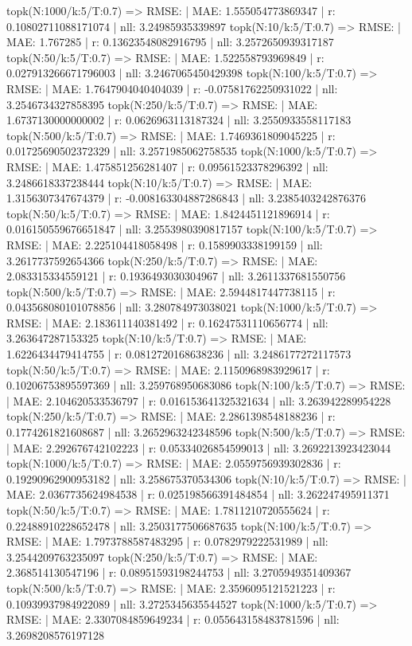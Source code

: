 topk(N:1000/k:5/T:0.7) => RMSE: | MAE: 1.555054773869347 | r: 0.10802711088171074 | nll: 3.24985935339897
topk(N:10/k:5/T:0.7) => RMSE: | MAE: 1.767285 | r: 0.13623548082916795 | nll: 3.2572650939317187
topk(N:50/k:5/T:0.7) => RMSE: | MAE: 1.522558793969849 | r: 0.027913266671796003 | nll: 3.2467065450429398
topk(N:100/k:5/T:0.7) => RMSE: | MAE: 1.7647904040404039 | r: -0.07581762250931022 | nll: 3.2546734327858395
topk(N:250/k:5/T:0.7) => RMSE: | MAE: 1.6737130000000002 | r: 0.0626963113187324 | nll: 3.2550933558117183
topk(N:500/k:5/T:0.7) => RMSE: | MAE: 1.7469361809045225 | r: 0.01725690502372329 | nll: 3.2571985062758535
topk(N:1000/k:5/T:0.7) => RMSE: | MAE: 1.475851256281407 | r: 0.09561523378296392 | nll: 3.2486618337238444
topk(N:10/k:5/T:0.7) => RMSE: | MAE: 1.3156307347674379 | r: -0.008163304887286843 | nll: 3.2385403242876376
topk(N:50/k:5/T:0.7) => RMSE: | MAE: 1.8424451121896914 | r: 0.016150559676651847 | nll: 3.2553980390817157
topk(N:100/k:5/T:0.7) => RMSE: | MAE: 2.225104418058498 | r: 0.1589903338199159 | nll: 3.2617737592654366
topk(N:250/k:5/T:0.7) => RMSE: | MAE: 2.083315334559121 | r: 0.1936493030304967 | nll: 3.2611337681550756
topk(N:500/k:5/T:0.7) => RMSE: | MAE: 2.5944817447738115 | r: 0.043568080101078856 | nll: 3.280784973038021
topk(N:1000/k:5/T:0.7) => RMSE: | MAE: 2.183611140381492 | r: 0.16247531110656774 | nll: 3.263647287153325
topk(N:10/k:5/T:0.7) => RMSE: | MAE: 1.6226434479414755 | r: 0.0812720168638236 | nll: 3.2486177272117573
topk(N:50/k:5/T:0.7) => RMSE: | MAE: 2.1150968983929617 | r: 0.10206753895597369 | nll: 3.259768950683086
topk(N:100/k:5/T:0.7) => RMSE: | MAE: 2.104620533536797 | r: 0.016153641325321634 | nll: 3.263942289954228
topk(N:250/k:5/T:0.7) => RMSE: | MAE: 2.2861398548188236 | r: 0.1774261821608687 | nll: 3.2652963242348596
topk(N:500/k:5/T:0.7) => RMSE: | MAE: 2.292676742102223 | r: 0.05334026854599013 | nll: 3.2692213923423044
topk(N:1000/k:5/T:0.7) => RMSE: | MAE: 2.0559756939302836 | r: 0.19290962900953182 | nll: 3.258675370534306
topk(N:10/k:5/T:0.7) => RMSE: | MAE: 2.0367735624984538 | r: 0.025198566391484854 | nll: 3.262247495911371
topk(N:50/k:5/T:0.7) => RMSE: | MAE: 1.7811210720555624 | r: 0.22488910228652478 | nll: 3.2503177506687635
topk(N:100/k:5/T:0.7) => RMSE: | MAE: 1.7973788587483295 | r: 0.0782979222531989 | nll: 3.2544209763235097
topk(N:250/k:5/T:0.7) => RMSE: | MAE: 2.368514130547196 | r: 0.08951593198244753 | nll: 3.2705949351409367
topk(N:500/k:5/T:0.7) => RMSE: | MAE: 2.3596095121521223 | r: 0.10939937984922089 | nll: 3.2725345635544527
topk(N:1000/k:5/T:0.7) => RMSE: | MAE: 2.3307084859649234 | r: 0.055643158483781596 | nll: 3.2698208576197128
